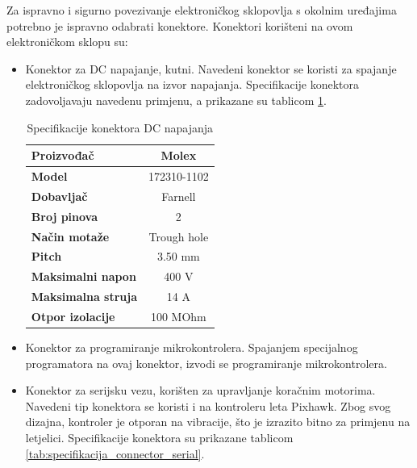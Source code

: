 \documentclass[11pt,a4paper]{article}
\begin{document}
Za ispravno i sigurno povezivanje elektroničkog sklopovlja s okolnim uređajima potrebno je ispravno odabrati konektore. Konektori korišteni na ovom elektroničkom sklopu su:
\begin{center}
	\begin{itemize}
		\item Konektor za DC napajanje, kutni. Navedeni konektor se koristi za spajanje elektroničkog sklopovlja na izvor napajanja. Specifikacije konektora zadovoljavaju navedenu primjenu, a prikazane su tablicom \ref{tab:specifikacija_supply_connector}.
		
\begin{table}[H]
	\centering
	\caption{Specifikacije konektora DC napajanja}
	\label{tab:specifikacija_supply_connector}
	\begin{tabular}{|l|c|}
		\hline
		\textbf{Proizvođač} & Molex \\ \hline 
		\textbf{Model} & 172310-1102 \\ \hline 
		\textbf{Dobavljač} & Farnell \\ \hline 
		\textbf{Broj pinova} & 2 \\ \hline 
		\textbf{Način motaže} & Trough hole    \\ \hline
		\textbf{Pitch} & 3.50 mm    \\ \hline 
		\textbf{Maksimalni napon} & 400 V \\ \hline 
		\textbf{Maksimalna struja} & 14 A \\ \hline
		\textbf{Otpor izolacije} & 100 MOhm \\ \hline
	\end{tabular}
\end{table}		
		
		\item Konektor za programiranje mikrokontrolera. Spajanjem specijalnog programatora na ovaj konektor, izvodi se programiranje mikrokontrolera.
		
		\item Konektor za serijsku vezu, korišten za upravljanje koračnim motorima. Navedeni tip konektora se koristi i na kontroleru leta Pixhawk. Zbog svog dizajna, kontroler je otporan na vibracije, što je izrazito bitno za primjenu na letjelici. Specifikacije konektora su prikazane tablicom \ref{tab:specifikacija_connector_serial}.
		

\end{itemize}
\end{center}
\end{document}
